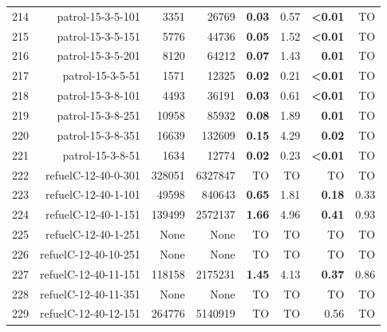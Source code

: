\begin{longtable}{lrr@{\hskip 12pt}r@{\hskip 12pt}r@{\hskip 12pt}r@{\hskip 12pt}r@{\hskip 12pt}r}
214 & \multirow{1}{*}{patrol-15-3-5-101} & \multirow{1}{*}{3351} & \multirow{1}{*}{26769} & \textbf{0.03} & 0.57 & \textbf{<0.01} & TO \\
215 & \multirow{1}{*}{patrol-15-3-5-151} & \multirow{1}{*}{5776} & \multirow{1}{*}{44736} & \textbf{0.05} & 1.52 & \textbf{<0.01} & TO \\
216 & \multirow{1}{*}{patrol-15-3-5-201} & \multirow{1}{*}{8120} & \multirow{1}{*}{64212} & \textbf{0.07} & 1.43 & \textbf{0.01} & TO \\
217 & \multirow{1}{*}{patrol-15-3-5-51} & \multirow{1}{*}{1571} & \multirow{1}{*}{12325} & \textbf{0.02} & 0.21 & \textbf{<0.01} & TO \\
218 & \multirow{1}{*}{patrol-15-3-8-101} & \multirow{1}{*}{4493} & \multirow{1}{*}{36191} & \textbf{0.03} & 0.61 & \textbf{<0.01} & TO \\
219 & \multirow{1}{*}{patrol-15-3-8-251} & \multirow{1}{*}{10958} & \multirow{1}{*}{85932} & \textbf{0.08} & 1.89 & \textbf{0.01} & TO \\
220 & \multirow{1}{*}{patrol-15-3-8-351} & \multirow{1}{*}{16639} & \multirow{1}{*}{132609} & \textbf{0.15} & 4.29 & \textbf{0.02} & TO \\
221 & \multirow{1}{*}{patrol-15-3-8-51} & \multirow{1}{*}{1634} & \multirow{1}{*}{12774} & \textbf{0.02} & 0.23 & \textbf{<0.01} & TO \\
222 & \multirow{1}{*}{refuelC-12-40-0-301} & \multirow{1}{*}{328051} & \multirow{1}{*}{6327847} & TO & TO & TO & TO \\
223 & \multirow{1}{*}{refuelC-12-40-1-101} & \multirow{1}{*}{49598} & \multirow{1}{*}{840643} & \textbf{0.65} & 1.81 & \textbf{0.18} & 0.33 \\
224 & \multirow{1}{*}{refuelC-12-40-1-151} & \multirow{1}{*}{139499} & \multirow{1}{*}{2572137} & \textbf{1.66} & 4.96 & \textbf{0.41} & 0.93 \\
225 & \multirow{1}{*}{refuelC-12-40-1-251} & \multirow{1}{*}{None} & \multirow{1}{*}{None} & TO & TO & TO & TO \\
226 & \multirow{1}{*}{refuelC-12-40-10-251} & \multirow{1}{*}{None} & \multirow{1}{*}{None} & TO & TO & TO & TO \\
227 & \multirow{1}{*}{refuelC-12-40-11-151} & \multirow{1}{*}{118158} & \multirow{1}{*}{2175231} & \textbf{1.45} & 4.13 & \textbf{0.37} & 0.86 \\
228 & \multirow{1}{*}{refuelC-12-40-11-351} & \multirow{1}{*}{None} & \multirow{1}{*}{None} & TO & TO & TO & TO \\
229 & \multirow{1}{*}{refuelC-12-40-12-151} & \multirow{1}{*}{264776} & \multirow{1}{*}{5140919} & TO & TO & 0.56 & TO \\

\end{longtable}
